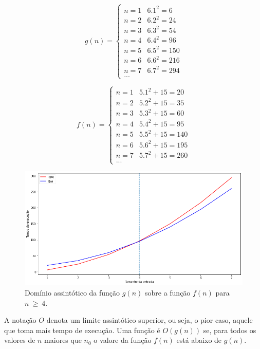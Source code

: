 \documentclass[11pt,fleqn]{book} %
\begin{document}
\begin{minipage}[c]{.5\textwidth}
\[ g(n) =
  \begin{cases}
    n=1  & 6.1^2 = 6\\
    n=2  & 6.2^2 = 24\\
    n=3  & 6.3^2 = 54\\
    n=4  & 6.4^2 = 96\\
    n=5  & 6.5^2 = 150\\
    n=6  & 6.6^2 = 216\\
    n=7  & 6.7^2 = 294\\
    ...
  \end{cases}
\]
\end{minipage}\hfill
\begin{minipage}[c]{.5\textwidth}
\[ f(n) =
  \begin{cases}
    n=1  & 5.1^2+15 = 20\\
    n=2  & 5.2^2+15 = 35\\
    n=3  & 5.3^2+15 = 60\\
    n=4  & 5.4^2+15 = 95\\
    n=5  & 5.5^2+15 = 140\\
    n=6  & 5.6^2+15 = 195\\
    n=7  & 5.7^2+15 = 260\\
    ...
  \end{cases}
\]
\end{minipage}
\hfill
\begin{figure}[htbp]
\centering
	\includegraphics[width=.95\textwidth]{Pictures/BigO.png}
	\caption[Big O]{Domínio assintótico da função $g(n)$ sobre a função $f(n)$ para $n~\geq~4$.}
	\label{BigO}
\end{figure}

A notação $O$ denota um limite assintótico superior, ou seja, o pior caso, aquele que toma mais tempo de execução.
Uma função é $O(g(n))$ se, para todos os valores de $n$ maiores que $n_0$ o valore da função $f(n)$ está abaixo de $g(n)$.
\end{document}
